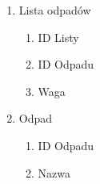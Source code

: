 \begin{enumerate}
		\item Lista odpadów
		\begin{enumerate}
			\item ID Listy
			\item ID Odpadu
			\item Waga
		\end{enumerate}

		\item Odpad
		\begin{enumerate}
			\item ID Odpadu
			\item Nazwa
		\end{enumerate}
	\end{enumerate}